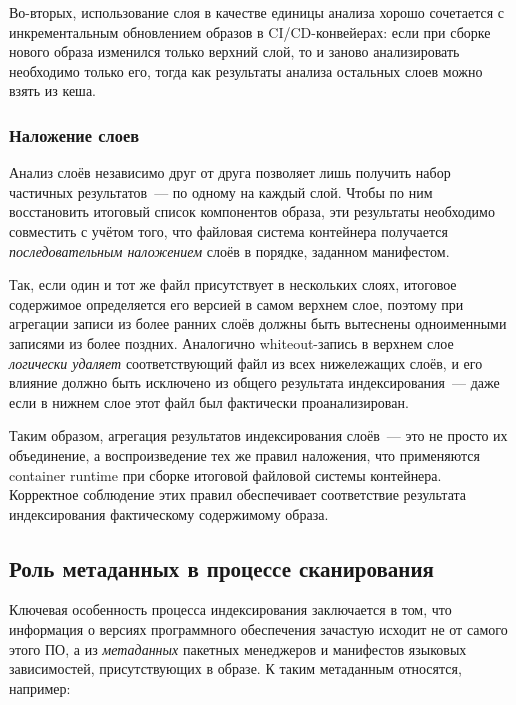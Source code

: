 Во-вторых, использование слоя в качестве единицы анализа хорошо сочетается с инкрементальным обновлением образов в CI/CD-конвейерах: если при сборке нового образа изменился только верхний слой, то и заново анализировать необходимо только его, тогда как результаты анализа остальных слоев можно взять из кеша.

\subsubsection{Наложение слоев}

Анализ слоёв независимо друг от друга позволяет лишь получить набор частичных результатов~--- по одному на каждый слой. Чтобы по ним восстановить итоговый список компонентов образа, эти результаты необходимо совместить с учётом того, что файловая система контейнера получается \textit{последовательным наложением} слоёв в порядке, заданном манифестом.

Так, если один и тот же файл присутствует в нескольких слоях, итоговое содержимое определяется его версией в самом верхнем слое, поэтому при агрегации записи из более ранних слоёв должны быть вытеснены одноименными записями из более поздних. Аналогично whiteout-запись в верхнем слое \textit{логически удаляет} соответствующий файл из всех нижележащих слоёв, и его влияние должно быть исключено из общего результата индексирования~--- даже если в нижнем слое этот файл был фактически проанализирован.

Таким образом, агрегация результатов индексирования слоёв~--- это не просто их объединение, а воспроизведение тех же правил наложения, что применяются container runtime при сборке итоговой файловой системы контейнера. Корректное соблюдение этих правил обеспечивает соответствие результата индексирования фактическому содержимому образа.

\subsection{Роль метаданных в процессе сканирования}

Ключевая особенность процесса индексирования заключается в том, что информация о версиях программного обеспечения зачастую исходит не от самого этого ПО, а из \textit{метаданных} пакетных менеджеров и манифестов языковых зависимостей, присутствующих в образе. К таким метаданным относятся, например:


